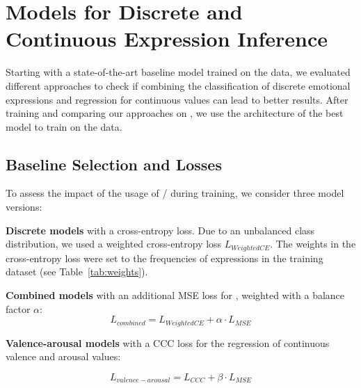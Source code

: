 \section{Models for Discrete and Continuous Expression Inference}
\label{sec:method}

Starting with a state-of-the-art baseline model trained on the \affectnet{} data, we evaluated different approaches to check if combining the classification of discrete emotional expressions and regression for continuous \va{} values can lead to better results. After training and comparing our approaches on \affectnet{}, we use the architecture of the best model to train on the \emotic{} data.

\subsection{Baseline Selection and Losses}
 
To assess the impact of the usage of \val{}/\aro{} during training, we consider three model versions:

\textbf{Discrete models} with a cross-entropy loss. Due to an unbalanced class distribution, we used a weighted cross-entropy loss $L_{WeightedCE}$. The weights in the cross-entropy loss were set to the frequencies of expressions in the training dataset (see Table~\ref{tab:weights}). 

\textbf{Combined models} with an additional MSE loss for \va{}, weighted with a balance factor $\alpha$: 
\begin{equation}
L_{combined} = L_{WeightedCE} + \alpha \cdot L_{MSE}
\end{equation}


\textbf{Valence-arousal models} with a CCC loss for the regression of continuous valence and arousal values:

\begin{equation}
L_{valence-arousal} = L_{CCC} + \beta \cdot L_{MSE}
\end{equation}

